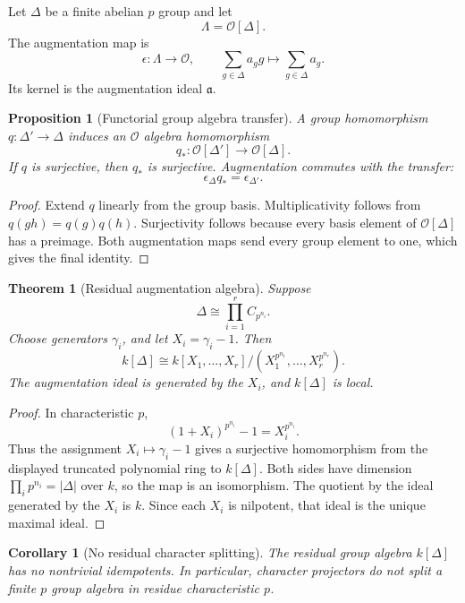\documentclass{aomart}
\newtheorem{theorem}{Theorem}[section]
\newtheorem{proposition}[proposition]{Proposition}
\newtheorem{corollary}[corollary]{Corollary}
\theoremstyle{definition}
\theoremstyle{remark}
\newcommand{\OO}{\mathcal O}
\newcommand{\abs}[1]{\left\lvert#1\right\rvert}
\newcommand{\fraka}{\mathfrak a}
\begin{document}
Let \(\Delta\) be a finite abelian \(p\) group and let
\[
\Lambda=\OO[\Delta].
\]
The augmentation map is
\[
\epsilon:\Lambda\longrightarrow\OO,
\qquad
\sum_{g\in\Delta}a_gg\longmapsto\sum_{g\in\Delta}a_g.
\]
Its kernel is the augmentation ideal \(\fraka\).

\begin{proposition}[Functorial group algebra transfer]\label{prop:group_algebra_transfer}
A group homomorphism \(q:\Delta'\to\Delta\) induces an \(\OO\) algebra homomorphism
\[
q_*:\OO[\Delta']\longrightarrow\OO[\Delta].
\]
If \(q\) is surjective, then \(q_*\) is surjective. Augmentation commutes with the transfer:
\[
\epsilon_\Delta q_*=\epsilon_{\Delta'}.
\]
\end{proposition}

\begin{proof}
Extend \(q\) linearly from the group basis. Multiplicativity follows from \(q(gh)=q(g)q(h)\). Surjectivity follows because every basis element of \(\OO[\Delta]\) has a preimage. Both augmentation maps send every group element to one, which gives the final identity.
\end{proof}

\begin{theorem}[Residual augmentation algebra]\label{thm:residual_augmentation_algebra}
Suppose
\[
\Delta\cong
\prod_{i=1}^{r}C_{p^{n_i}}.
\]
Choose generators \(\gamma_i\), and let \(X_i=\gamma_i-1\). Then
\[
\boxed{
k[\Delta]
\cong
k[X_1,\ldots,X_r]
\big/
(X_1^{p^{n_1}},\ldots,X_r^{p^{n_r}}).
}
\]
The augmentation ideal is generated by the \(X_i\), and \(k[\Delta]\) is local.
\end{theorem}

\begin{proof}
In characteristic \(p\),
\[
(1+X_i)^{p^{n_i}}-1=X_i^{p^{n_i}}.
\]
Thus the assignment \(X_i\mapsto\gamma_i-1\) gives a surjective homomorphism from the displayed truncated polynomial ring to \(k[\Delta]\). Both sides have dimension \(\prod_ip^{n_i}=\abs{\Delta}\) over \(k\), so the map is an isomorphism. The quotient by the ideal generated by the \(X_i\) is \(k\). Since each \(X_i\) is nilpotent, that ideal is the unique maximal ideal.
\end{proof}

\begin{corollary}[No residual character splitting]\label{cor:no_residual_character_splitting}
The residual group algebra \(k[\Delta]\) has no nontrivial idempotents. In particular, character projectors do not split a finite \(p\) group algebra in residue characteristic \(p\).
\end{corollary}
\end{document}
